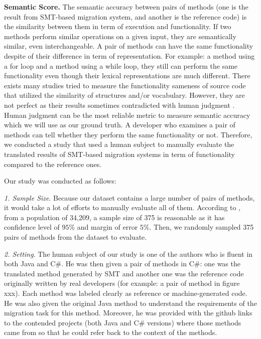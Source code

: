 \textbf{Semantic Score.}
The semantic accuracy between pairs of methods (one is the result from SMT-based migration system, and another is the reference code) is the similarity between them in term of execution and functionality.  If two methods perform similar operations on a given input, they are semantically similar, even interchangeable\cite{icuimc13-park}. A pair of methods can have the same functionality despite of their difference in term of representation. For example: a method using a for loop and a method using a while loop, they still can perform the same functionality even though their lexical representations are much different.  
There exists many studies tried to measure the functionality sameness of source code that utilized the similarity of structures and/or vocabulary. However, they are not perfect as their results sometimes contradicted with human judgment \cite{fse14-higo}. Human judgment can be the most reliable metric to measure semantic accuracy which we will use as our ground truth. A developer who examines a pair of methods can tell whether they perform the same functionality or not. Therefore, we conducted a  study that used a human subject to manually evaluate the translated results of SMT-based migration systems in term of functionality compared to the reference ones.

Our study was conducted as follows:

\emph{1. Sample Size}. Because our dataset contains a large number of pairs of methods, it would take a lot of efforts to manually evaluate all of them. According to \cite{website}, from a population of 34,209, a sample size of 375 is reasonable as it has confidence level of $95\%$ and margin of error $5\%$. Then, we randomly sampled 375 pairs of methods from the dataset to evaluate. 

\emph{2. Setting}. The human subject of our study is one of the authors who is fluent in both Java and C\#. He was then given a pair of methods in C\#: one was the translated method generated by SMT and another one was the reference code originally written by real developers (for example: a pair of method in figure xxx). Each method was labeled clearly as reference or machine-generated code. He was also given the original Java method to understand the requirements of the migration task for this method. Moreover, he was provided with the github links to the contended projects (both Java and C\# versions) where those methods came from so that he could refer back to the context of the methods.

